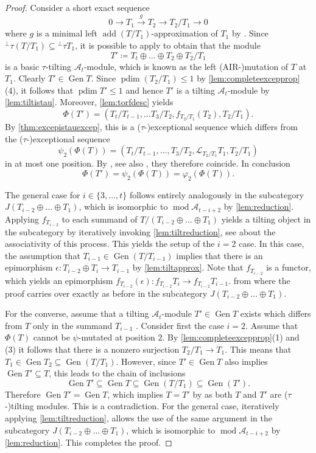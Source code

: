 \documentclass[10pt,twoside, a4paper,reqno]{amsart}
\DeclareMathOperator{\mods}{mod}
\DeclareMathOperator{\projdim}{pdim}
\DeclareMathOperator{\add}{add}
\DeclareMathOperator{\Gen}{Gen}
\newcommand{\A}{\mathscr{A}}
\theoremstyle{definition}
\begin{document}
\begin{proof}
	Consider a short exact sequence
	\[ 0 \to T_1 \xrightarrow{g} T_2 \to T_2/T_1 \to 0 \]
	where $g$ is a minimal left $\add(T/T_1)$-approximation of $T_1$ by \cite[Lem. 4.3(2)]{IyamaZhang2020}. Since ${}^\perp \tau(T/T_1) \subseteq {}^\perp \tau T_1$, it is possible to apply \cite[Thm. 2.30]{AIR2014} to obtain that the module 
	\[ T' \coloneqq T_t \oplus \dots \oplus T_2 \oplus T_2/T_1 \]
	is a basic $\tau$-tilting $\A_t$-module, which is known as the left (AIR-)mutation of $T$ at $T_1$. Clearly $T' \in \Gen T$. Since $\projdim (T_2/T_1) \leq 1$ by \cref{lem:completeexcepprop}(4), it follows that $\projdim T' \leq 1$ and hence $T'$ is a tilting $\A_t$-module by \cref{lem:tiltistau}. Moreover, \cref{lem:torfdesc} yields 
	\[ \Phi(T') = (T_t/T_{t-1}, \dots T_3/T_2 , f_{T_2/T_1} (T_2) , T_2/T_1). \]
	By \cref{thm:excepistauexcep}, this is a ($\tau$-)exceptional sequence which differs from the ($\tau$-)exceptional sequence 
	\[ \psi_2(\Phi(T)) = (T_t/T_{t-1}, \dots, T_3/T_2, \mathcal{L}_{T_2/T_1} T_1, T_2/T_1) \]
	in at most one position. By \cite[Thm. 2.1(a)]{BuanMarsh2023}, see also \cite[Thm. 8]{HansonThomas2024}, they therefore coincide. In conclusion
	\[ \Phi(T') = \psi_2 (\Phi(T)) = \varphi_2 (\Phi(T)). \]
	
	The general case for $i \in \{3, \dots, t\}$ follows entirely analogously in the subcategory $J(T_{i-2} \oplus \dots \oplus T_1)$, which is isomorphic to $\mods \A_{t-i+2}$ by \cref{lem:reduction}. Applying $f_{T_{i-2}}$ to each summand of $T/(T_{i-2} \oplus \dots \oplus T_1)$ yields a tilting object in the subcategory by iteratively invoking \cref{lem:tiltreduction}, see \cite[Cor. 1.7]{BuanMarsh2021w} about the associativity of this process. This yields the setup of the $i=2$ case. In this case, the assumption that $T_{i-1} \in \Gen(T/T_{i-1})$ implies that there is an epimorphism $\epsilon: T_{i-2} \oplus T_i \to T_{i-1}$ by \cref{lem:tiltapprox}. Note that $f_{T_{i-2}}$ is a functor, which yields an epimorphism $f_{T_{i-2}}(\epsilon): f_{T_{i-2}} T_i \to f_{T_{i-2}} T_{i-1}$.  from where the proof carries over exactly as before in the subcategory $J(T_{i-2} \oplus \dots \oplus T_1)$. 
	
	
	For the converse, assume that a tilting $\A_t$-module $T' \in \Gen T$ exists which differs from $T$ only in the summand $T_{i-1}$ . Consider first the case $i=2$. Assume that $\Phi(T)$ cannot be $\psi$-mutated at position $2$. By \cref{lem:completeexcepprop}(1) and (3) it follows that there is a nonzero surjection $T_2/T_1 \to T_1$. This means that $T_1 \in \Gen T_2 \subseteq \Gen (T/T_1)$. However, since $T' \in \Gen T$ also implies $\Gen T' \subseteq T$, this leads to the chain of inclusions
	\[ \Gen T' \subseteq \Gen T \subseteq \Gen(T/T_1) \subseteq \Gen(T').  \]
	Therefore $\Gen T' = \Gen T$, which implies $T= T'$ by \cite[Thm. 2.7]{AIR2014} as both $T$ and $T'$ are ($\tau$-)tilting modules. This is a contradiction. For the general case, iteratively applying \cref{lem:tiltreduction}, allows the use of the same argument in the subcategory $J(T_{i-2} \oplus \dots \oplus T_1)$, which is isomorphic to $\mods \A_{t-i+2}$ by \cref{lem:reduction}. This completes the proof.
\end{proof}
\end{document}
